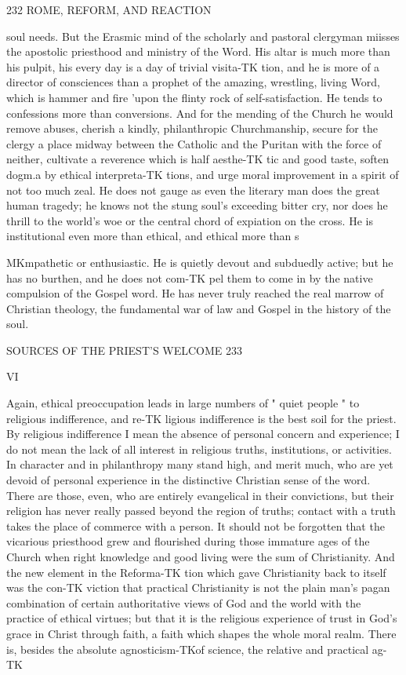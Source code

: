 \documentclass[12pt,a5paper,oneside]{book}
\begin{document}
{{232 ROME, REFORM, AND REACTION 

soul needs. But the Erasmic mind of the scholarly 
and pastoral clergyman miisses the apostolic priesthood 
and ministry of the Word. His altar is much more 
than his pulpit, his every day is a day of trivial visita-TK
tion, and he is more of a director of consciences than 
a prophet of the amazing, wrestling, living Word, 
which is hammer and fire 'upon the flinty rock of 
self-satisfaction. He tends to confessions more than 
conversions. And for the mending of the Church he 
would remove abuses, cherish a kindly, philanthropic 
Churchmanship, secure for the clergy a place midway 
between the Catholic and the Puritan with the force 
of neither, cultivate a reverence which is half aesthe-TK
tic and good taste, soften dogm.a by ethical interpreta-TK
tions, and urge moral improvement in a spirit of not 
too much zeal. He does not gauge as even the 
literary man does the great human tragedy; he 
knows not the stung soul's exceeding bitter cry, nor 
does he thrill to the world's woe or the central chord 
of expiation on the cross. He is institutional even 
more than ethical, and ethical more than s}MKmpathetic 
or enthusiastic. He is quietly devout and subduedly 
active; but he has no burthen, and he does not com-TK
pel them to come in by the native compulsion of the 
Gospel word. He has never truly reached the real 
marrow of Christian theology, the fundamental war 
of law and Gospel in the history of the soul. 



SOURCES OF THE PRIEST'S WELCOME 233 

VI 

Again, ethical preoccupation leads in large numbers 
of " quiet people " to religious indifference, and re-TK
ligious indifference is the best soil for the priest. By 
religious indifference I mean the absence of personal 
concern and experience; I do not mean the lack of all 
interest in religious truths, institutions, or activities. 
In character and in philanthropy many stand high, and 
merit much, who are yet devoid of personal experience 
in the distinctive Christian sense of the word. There 
are those, even, who are entirely evangelical in their 
convictions, but their religion has never really passed 
beyond the region of truths; contact with a truth takes 
the place of commerce with a person. It should not 
be forgotten that the vicarious priesthood grew and 
flourished during those immature ages of the Church 
when right knowledge and good living were the sum of 
Christianity. And the new element in the Reforma-TK
tion which gave Christianity back to itself was the con-TK
viction that practical Christianity is not the plain man's 
pagan combination of certain authoritative views of God 
and the world with the practice of ethical virtues; but 
that it is the religious experience of trust in God's 
grace in Christ through faith, a faith which shapes the 
whole moral realm. There is, besides the absolute 
agnosticism-TKof science, the relative and practical ag-TK



}
\end{document}
